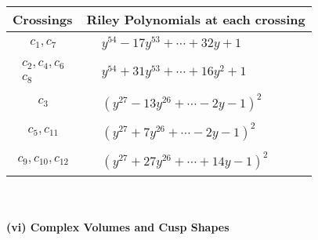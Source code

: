 \documentclass[1p]{elsarticle_modified}
\theoremstyle{definition}
\begin{document}
\begin{tabular}{m{50pt}|m{274pt}}
Crossings & \hspace{64pt}Riley Polynomials at each crossing \\
\hline $$\begin{aligned}c_{1},c_{7}\end{aligned}$$&$\begin{aligned}
&y^{54}-17 y^{53}+\cdots+32 y+1
\end{aligned}$\\
\hline $$\begin{aligned}c_{2},c_{4},c_{6}\\c_{8}\end{aligned}$$&$\begin{aligned}
&y^{54}+31 y^{53}+\cdots+16 y^2+1
\end{aligned}$\\
\hline $$\begin{aligned}c_{3}\end{aligned}$$&$\begin{aligned}
&(y^{27}-13 y^{26}+\cdots-2 y-1)^{2}
\end{aligned}$\\
\hline $$\begin{aligned}c_{5},c_{11}\end{aligned}$$&$\begin{aligned}
&(y^{27}+7 y^{26}+\cdots-2 y-1)^{2}
\end{aligned}$\\
\hline $$\begin{aligned}c_{9},c_{10},c_{12}\end{aligned}$$&$\begin{aligned}
&(y^{27}+27 y^{26}+\cdots+14 y-1)^{2}
\end{aligned}$\\
\hline
\end{tabular}\\~\\
\newpage\flushleft \textbf{(vi) Complex Volumes and Cusp Shapes}
\end{document}

